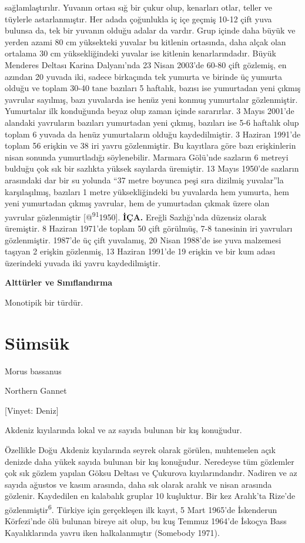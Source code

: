 \documentclass[
  letterpaper,
  DIV=11,
  numbers=noendperiod]{scrreprt}
\begin{document}
sağlamlaştırılır. Yuvanın ortası sığ bir çukur olup, kenarları otlar,
teller ve tüylerle astarlanmıştır. Her adada çoğunlukla iç içe geçmiş
10-12 çift yuva bulunsa da, tek bir yuvanın olduğu adalar da vardır.
Grup içinde daha büyük ve yerden azami 80 cm yüksekteki yuvalar bu
kitlenin ortasında, daha alçak olan ortalama 30 cm yüksekliğindeki
yuvalar ise kitlenin kenarlarındadır. Büyük Menderes Deltası Karina
Dalyanı'nda 23 Nisan 2003'de 60-80 çift gözlemiş, en azından 20 yuvada
iki, sadece birkaçında tek yumurta ve birinde üç yumurta olduğu ve
toplam 30-40 tane bazıları 5 haftalık, bazısı ise yumurtadan yeni çıkmış
yavrular sayılmış, bazı yuvalarda ise henüz yeni konmuş yumurtalar
gözlenmiştir. Yumurtalar ilk konduğunda beyaz olup zaman içinde
sararırlar. 3 Mayıs 2001'de alandaki yavruların bazıları yumurtadan yeni
çıkmış, bazıları ise 5-6 haftalık olup toplam 6 yuvada da henüz
yumurtaların olduğu kaydedilmiştir. 3 Haziran 1991'de toplam 56 erişkin
ve 38 iri yavru gözlenmiştir. Bu kayıtlara göre bazı erişkinlerin nisan
sonunda yumurtladığı söylenebilir. Marmara Gölü'nde sazların 6 metreyi
bulduğu çok sık bir sazlıkta yüksek sayılarda üremiştir. 13 Mayıs
1950'de sazların arasındaki dar bir su yolunda ``37 metre boyunca peşi
sıra dizilmiş yuvalar''la karşılaşılmış, bazıları 1 metre
yüksekliğindeki bu yuvalarda hem yumurta, hem yeni yumurtadan çıkmış
yavrular, hem de yumurtadan çıkmak üzere olan yavrular gözlenmiştir
{[}@\textsuperscript{91}1950{]}. \textbf{İÇA.} Ereğli Sazlığı'nda
düzensiz olarak üremiştir. 8 Haziran 1971'de toplam 50 çift görülmüş,
7-8 tanesinin iri yavruları gözlenmiştir. 1987'de üç çift yuvalamış, 20
Nisan 1988'de ise yuva malzemesi taşıyan 2 erişkin gözlenmiş, 13 Haziran
1991'de 19 erişkin ve bir kum adası üzerindeki yuvada iki yavru
kaydedilmiştir.

\textbf{Alttürler ve Sınıflandırma}

Monotipik bir türdür.

\section{Sümsük}\label{suxfcmsuxfck}

Morus bassanus

Northern Gannet

{[}Vinyet: Deniz{]}

Akdeniz kıyılarında lokal ve az sayıda bulunan bir kış konuğudur.

Özellikle Doğu Akdeniz kıyılarında seyrek olarak görülen, muhtemelen
açık denizde daha yükek sayıda bulunan bir kış konuğudur. Neredeyse tüm
gözlemler çok sık gözlem yapılan Göksu Deltası ve Çukurova
kıyılarındandır. Nadiren ve az sayıda ağustos ve kasım arasında, daha
sık olarak aralık ve nisan arasında gözlenir. Kaydedilen en kalabalık
gruplar 10 kuşluktur. Bir kez Aralık'ta Rize'de
gözlenmiştir\textsuperscript{6}. Türkiye için gerçekleşen ilk kayıt, 5
Mart 1965'de İskenderun Körfezi'nde ölü bulunan bireye ait olup, bu kuş
Temmuz 1964'de İskoçya Bass Kayalıklarında yavru iken halkalanmıştır
(Somebody 1971).
\end{document}
